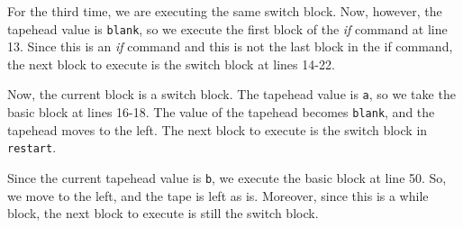 \noindent For the third time, we are executing the same switch block. Now, however, the tapehead value is \texttt{blank}, so we execute the first block of the \textit{if} command at line 13. Since this is an \textit{if} command and this is not the last block in the if command, the next block to execute is the switch block at lines 14-22.
\begin{figure}[H]
    \centering
\end{figure}
\noindent Now, the current block is a switch block. The tapehead value is \texttt{a}, so we take the basic block at lines 16-18. The value of the tapehead becomes \texttt{blank}, and the tapehead moves to the left. The next block to execute is the switch block in \texttt{restart}.
\begin{figure}[H]
    \centering
\end{figure}
\noindent Since the current tapehead value is \texttt{b}, we execute the basic block at line 50. So, we move to the left, and the tape is left as is. Moreover, since this is a while block, the next block to execute is still the switch block.
\begin{figure}[H]
    \centering
\end{figure}
